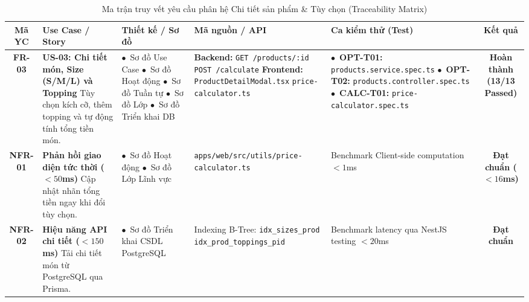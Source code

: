 \documentclass[a4paper]{article}
\begin{document}
\begin{table}[H]
\centering
\small
\begin{tabularx}{\textwidth}{|c|p{3.0cm}|p{3.0cm}|p{2.8cm}|X|c|}
\hline
\textbf{Mã YC} & \textbf{Use Case / Story} & \textbf{Thiết kế / Sơ đồ} & \textbf{Mã nguồn / API} & \textbf{Ca kiểm thử (Test)} & \textbf{Kết quả} \\ \hline
\textbf{FR-03} & 
\textbf{US-03: Chi tiết món, Size (S/M/L) và Topping} \newline 
Tùy chọn kích cỡ, thêm topping và tự động tính tổng tiền món. & 
$\bullet$~Sơ đồ Use Case \newline 
$\bullet$~Sơ đồ Hoạt động \newline 
$\bullet$~Sơ đồ Tuần tự \newline 
$\bullet$~Sơ đồ Lớp \newline 
$\bullet$~Sơ đồ Triển khai DB & 
\textbf{Backend:} \newline 
\texttt{GET /products/:id} \newline 
\texttt{POST /calculate} \newline 
\textbf{Frontend:} \newline 
\texttt{ProductDetailModal.tsx} \newline 
\texttt{price-calculator.ts} & 
$\bullet$~\textbf{OPT-T01:} \texttt{products.service.spec.ts} \newline 
$\bullet$~\textbf{OPT-T02:} \texttt{products.controller.spec.ts} \newline 
$\bullet$~\textbf{CALC-T01:} \texttt{price-calculator.spec.ts} & 
\textbf{Hoàn thành (13/13 Passed)} \\ \hline
\textbf{NFR-01} & 
\textbf{Phản hồi giao diện tức thời ($<50$ms)} \newline 
Cập nhật nhãn tổng tiền ngay khi đổi tùy chọn. & 
$\bullet$~Sơ đồ Hoạt động \newline 
$\bullet$~Sơ đồ Lớp Lĩnh vực & 
\texttt{apps/web/src/utils/price-calculator.ts} & 
Benchmark Client-side computation $< 1$ms & 
\textbf{Đạt chuẩn ($<16$ms)} \\ \hline
\textbf{NFR-02} & 
\textbf{Hiệu năng API chi tiết ($<150$ms)} \newline 
Tải chi tiết món từ PostgreSQL qua Prisma. & 
$\bullet$~Sơ đồ Triển khai CSDL PostgreSQL & 
Indexing B-Tree: \newline 
\texttt{idx\_sizes\_prod} \newline 
\texttt{idx\_prod\_toppings\_pid} & 
Benchmark latency qua NestJS testing $< 20$ms & 
\textbf{Đạt chuẩn} \\ \hline
\end{tabularx}
\caption{Ma trận truy vết yêu cầu phân hệ Chi tiết sản phẩm \& Tùy chọn (Traceability Matrix)}
\label{tab:traceability_member2}
\end{table}
\end{document}
